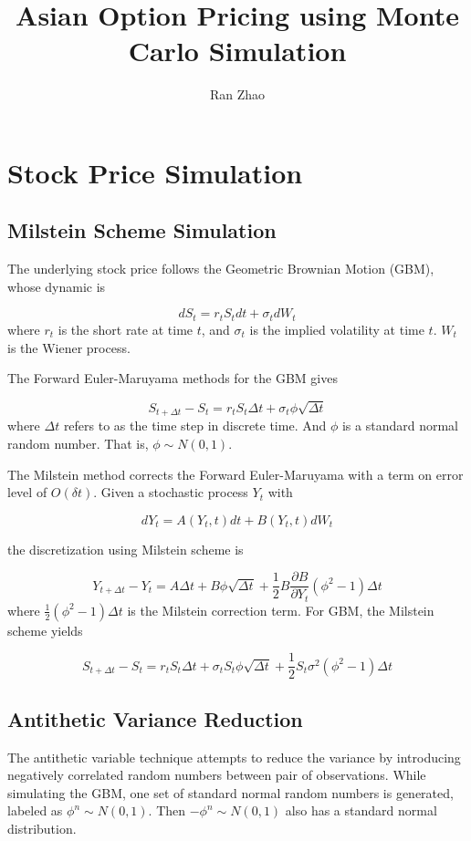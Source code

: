 \documentclass[a4paper,11pt] {article}
\author{Ran Zhao}
\title{Asian Option Pricing using Monte Carlo Simulation}
\date{}
\begin{document}
\maketitle


\section{Stock Price Simulation}
\subsection{Milstein Scheme Simulation}
The underlying stock price follows the Geometric Brownian Motion (GBM), whose dynamic is

\begin{equation} \label{eqn::GBM}
dS_t = r_t S_t dt + \sigma_t dW_t
\end{equation}
where $r_t$ is the short rate at time $t$, and $\sigma_t$ is the implied volatility at time $t$. $W_t$ is the Wiener process.

The Forward Euler-Maruyama methods for the GBM gives

$$
S_{t+\Delta t} - S_t = r_t S_t \Delta t + \sigma_t \phi \sqrt{\Delta t}
$$
where $\Delta t$ refers to as the time step in discrete time. And $\phi$ is a standard normal random number. That is, $\phi \sim N(0,1)$.

The Milstein method corrects the Forward Euler-Maruyama with a term on error level of $O(\delta t)$. Given a stochastic process $Y_t$ with

$$
dY_t = A(Y_t,t) dt + B(Y_t,t)dW_t
$$

the discretization using Milstein scheme is

$$
Y_{t+\Delta t} - Y_t = A \Delta t + B\phi \sqrt{\Delta t} + \frac{1}{2} B \frac{\partial B}{\partial Y_t} (\phi^2 - 1) \Delta t
$$
where $\frac{1}{2}(\phi^2 - 1) \Delta t$ is the Milstein correction term. For GBM, the Milstein scheme yields

$$
S_{t+\Delta t} - S_t = r_t S_t \Delta t + \sigma_t S_t \phi \sqrt{\Delta t} + \frac{1}{2} S_t \sigma^2 (\phi^2-1) \Delta t
$$

\subsection{Antithetic Variance Reduction}
The antithetic variable technique attempts to reduce the variance by introducing negatively correlated random numbers between pair of observations. While simulating the GBM, one set of standard normal random numbers is generated, labeled as $\phi^{n} \sim N(0,1)$. Then $-\phi^{n} \sim N(0,1)$ also has a standard normal distribution. 
\end{document}

